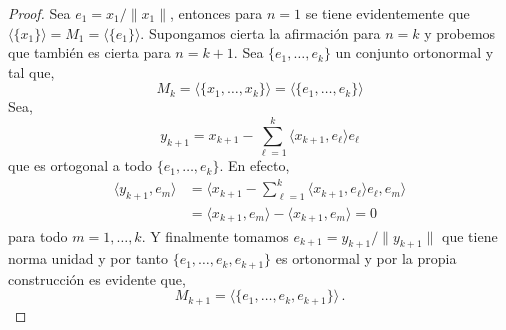 \documentclass[12pt]{book}
\newcommand{\norm}[1]{\lVert #1\rVert }
\newcommand{\lin}[1]{\langle #1 \rangle}
\newcommand{\Lin}[1]{\langle #1 \rangle}
\begin{document}
\begin{proof}
Sea $e_1=x_1/\norm{x_1}$, entonces para $n=1$ se tiene evidentemente que $\lin{\{x_1\}}=M_1=\lin{\{e_1\}}$. Supongamos cierta la afirmación para $n=k$ y probemos que también es cierta para $n=k+1$. Sea $\{e_1,\dots,e_k\}$ un conjunto ortonormal y tal que,
$$M_k=\lin{\{x_1,\dots,x_k\}}=\lin{\{e_1,\dots,e_k\}}$$
Sea,
$$y_{k+1}= x_{k+1} -\sum_{\ell=1}^k\lin{ x_{k+1}, e_\ell}e_\ell$$
que  es ortogonal a todo  $\{e_1,\dots,e_k\}$. En efecto,
\begin{align*}
\lin{y_{k+1}, e_m}&=\Lin{x_{k+1}-\sum_{\ell=1}^k\lin{x_{k+1},e_\ell} e_\ell,e_m}\\
&=\lin{x_{k+1},e_m}-\lin{x_{k+1},e_m}=0
\end{align*}
para todo $m=1,\dots, k$. Y finalmente tomamos $e_{k+1}=y_{k+1}/\norm{y_{k+1}}$ que  tiene norma unidad y por tanto $\{e_1,\dots,e_k,e_{k+1}\}$  es ortonormal y por la propia construcción es evidente que,
$$M_{k+1}=\lin{\{e_1,\dots, e_k,e_{k+1}\}}\,.$$  

\end{proof}
\end{document}
